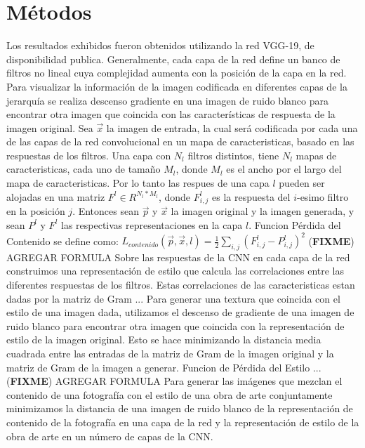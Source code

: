 \documentclass[a4paper,11pt,spanish]{book}
\newcommand*{\FIXME}[1]{{(\textbf{FIXME}) {#1}}}
\begin{document}
    \section{Métodos}
      Los resultados exhibidos fueron obtenidos utilizando la red VGG-19, de disponibilidad publica.
      Generalmente, cada capa de la red define un banco de filtros no lineal cuya complejidad aumenta con la posición de la capa en la red.
      Para visualizar la información de la imagen codificada en diferentes capas de la jerarquía se realiza descenso gradiente en una imagen de ruido blanco 
      para encontrar otra imagen que coincida con las características de respuesta de la imagen original.
      Sea $\overrightarrow{x}$ la imagen de entrada, la cual será codificada por cada una de las capas de la red convolucional en un mapa de caracteristicas, basado en las respuestas de los filtros.
      Una capa con $N_l$ filtros distintos, tiene $N_l$ mapas de caracteristicas, cada uno de tamaño $M_l$, donde $M_l$ es el ancho por el largo del mapa de caracteristicas.
      Por lo tanto las respues de una capa $l$ pueden ser alojadas en una matriz $F^l \in R^{N_l * M_l}$, donde $F_{i,j}^l$ es la respuesta del $i$-esimo filtro en la posición $j$.
      Entonces sean $\overrightarrow{p}$ y $\overrightarrow{x}$ la imagen original y la imagen generada, y sean $P^l$ y $F^l$ las respectivas representaciones en la capa $l$.
      Funcion Pérdida del Contenido se define como:
      $L_{contenido}(\overrightarrow{p},\overrightarrow{x}, l) = \frac{1}{2} \sum_{i,j} (F_{i,j}^l - P_{i,j}^l)^2$
      \FIXME{AGREGAR FORMULA}
      Sobre las respuestas de la CNN en cada capa de la red construimos una representación de estilo que calcula las correlaciones entre las diferentes respuestas de los filtros.
      Estas correlaciones de las caracteristicas estan dadas por la matriz de Gram ...
      Para generar una textura que coincida con el estilo de una imagen dada, utilizamos el descenso de gradiente de una imagen de ruido blanco para encontrar otra imagen que coincida 
      con la representación de estilo de la imagen original. Esto se hace minimizando la distancia media cuadrada entre las entradas de la matriz de Gram de la imagen 
      original y la matriz de Gram de la imagen a generar.
      Funcion de Pérdida del Estilo ...
      \FIXME{AGREGAR FORMULA}
      Para generar las imágenes que mezclan el contenido de una fotografía con el estilo de una obra de arte conjuntamente minimizamos la distancia de una imagen de ruido blanco 
      de la representación de contenido de la fotografía en una capa de la red y la representación de estilo de la obra de arte en un número de capas de la CNN.
\end{document}
